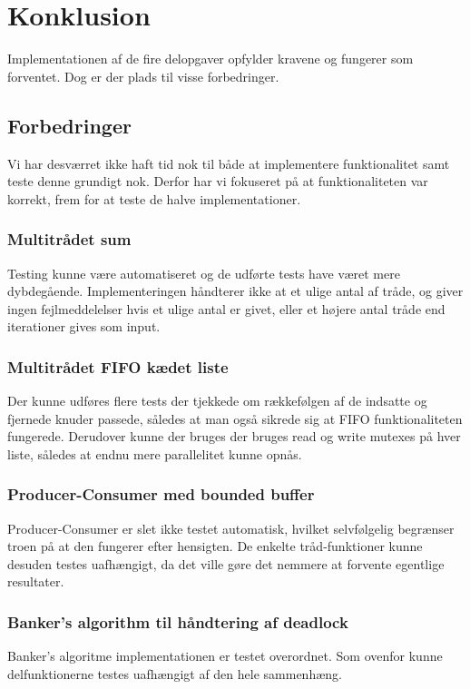 \section{Konklusion}
Implementationen af de fire delopgaver opfylder kravene og fungerer som forventet. Dog er der plads til visse forbedringer. 


\subsection{Forbedringer}
Vi har desværret ikke haft tid nok til både at implementere funktionalitet samt teste denne grundigt nok. Derfor har vi fokuseret på at funktionaliteten var korrekt, frem for at teste de halve implementationer.

\subsubsection{Multitrådet sum}
Testing kunne være automatiseret og de udførte tests have været mere dybdegående. Implementeringen håndterer ikke at et ulige antal af tråde, og giver ingen fejlmeddelelser hvis et ulige antal er givet, eller et højere antal tråde end iterationer gives som input.

\subsubsection{Multitrådet FIFO kædet liste}
Der kunne udføres flere tests der tjekkede om rækkefølgen af de indsatte og fjernede knuder passede, således at man også sikrede sig at FIFO funktionaliteten fungerede. Derudover kunne der bruges der bruges read og write mutexes på hver liste, således at endnu mere parallelitet kunne opnås.

\subsubsection{Producer-Consumer med bounded buffer}
Producer-Consumer er slet ikke testet automatisk, hvilket selvfølgelig begrænser troen på at den fungerer efter hensigten. De enkelte tråd-funktioner kunne desuden testes uafhængigt, da det ville gøre det nemmere at forvente egentlige resultater.

\subsubsection{Banker's algorithm til håndtering af deadlock}
Banker's algoritme implementationen er testet overordnet. Som ovenfor kunne delfunktionerne testes uafhængigt af den hele sammenhæng.